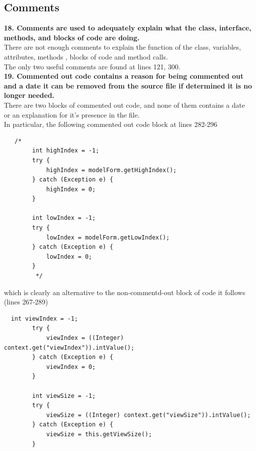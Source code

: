\documentclass{article}
\begin{document}
\begin{flushleft}
\subsection{Comments}

\textbf{18. Comments are used to adequately explain what the class, interface, methods, and blocks of code are doing.}\\
\vspace{0.5cm}
There are not enough comments to explain the function of the class, variables, attributes, methods , blocks of code and method calls.\\
\vspace{0.5cm}
The only two useful comments are found at lines 121, 300.\\
\vspace{0.5cm}
\textbf{19. Commented out code contains a reason for being commented out and a date it can be removed from the source file if determined it is no longer needed.}\\
\vspace{0.5cm}
There are two blocks of commented out code, and none of them contains a date or an explanation for it's presence in the file.\\
\vspace{0.5cm}
In particular, the following  commented out code block at lines 282-296\\
\vspace{0.5cm}
\begin{lstlisting}
   /*
        int highIndex = -1;
        try {
            highIndex = modelForm.getHighIndex();
        } catch (Exception e) {
            highIndex = 0;
        }

        int lowIndex = -1;
        try {
            lowIndex = modelForm.getLowIndex();
        } catch (Exception e) {
            lowIndex = 0;
        }
         */
           \end{lstlisting}
           \vspace{0.5cm}
which is clearly an alternative to the non-commentd-out  block of code it follows (lines 267-289)\\
\vspace{0.5cm}
\begin{lstlisting}
  int viewIndex = -1;
        try {
            viewIndex = ((Integer) context.get("viewIndex")).intValue();
        } catch (Exception e) {
            viewIndex = 0;
        }

        int viewSize = -1;
        try {
            viewSize = ((Integer) context.get("viewSize")).intValue();
        } catch (Exception e) {
            viewSize = this.getViewSize();
        }
          \end{lstlisting}
          

\end{flushleft}
\end{document}
